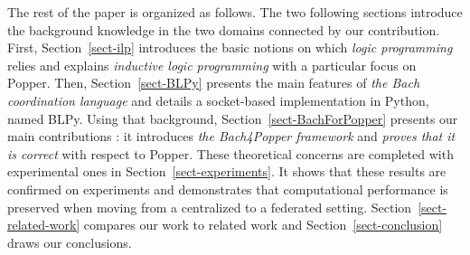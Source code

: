 The rest of the paper is organized as follows.
The two following sections introduce the background knowledge in the two domains connected by our contribution. First, Section~\ref{sect-ilp} introduces the basic notions on which \emph{logic programming} relies and explains \emph{inductive logic programming}  with a particular focus on Popper. Then, Section~\ref{sect-BLPy} presents the main features of \emph{the Bach coordination language} and details a socket-based implementation in Python, named BLPy. Using that background, Section~\ref{sect-BachForPopper} presents our main contributions : it introduces \emph{the Bach4Popper framework} and \emph{proves that it is correct} with respect to Popper. These theoretical concerns are completed with experimental ones in Section~\ref{sect-experiments}.  It shows that these results are 
confirmed on experiments and 
demonstrates that computational performance is preserved when moving from a centralized to a federated setting. Section~\ref{sect-related-work} compares our work to related work and Section~\ref{sect-conclusion} draws our conclusions.






